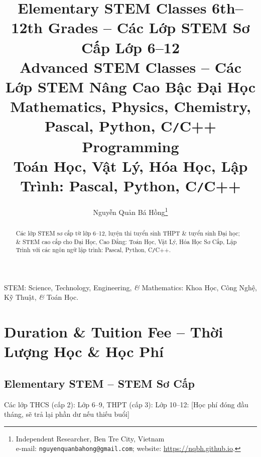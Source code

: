 \documentclass{article}
\title{Elementary STEM Classes 6th--12th Grades -- Các Lớp STEM Sơ Cấp Lớp 6--12\\Advanced STEM Classes -- Các Lớp STEM Nâng Cao Bậc Đại Học\\\vspace{5mm}Mathematics, Physics, Chemistry, Pascal, Python, C{\tt/}C++ Programming\\Toán Học, Vật Lý, Hóa Học, Lập Trình: Pascal, Python, C{\tt/}C++}
\author{Nguyễn Quản Bá Hồng\footnote{Independent Researcher, Ben Tre City, Vietnam\\e-mail: \texttt{nguyenquanbahong@gmail.com}; website: \url{https://nqbh.github.io}.}}
\date{}
\numberwithin{equation}{section}
\begin{document}
\maketitle
\begin{abstract}
	Các lớp STEM sơ cấp  từ lớp 6--12, luyện thi tuyển sinh THPT \& tuyển sinh Đại học; \& STEM cao cấp cho Đại Học, Cao Đẳng: Toán Học, Vật Lý, Hóa Học Sơ Cấp, Lập Trình với các ngôn ngữ lập trình: Pascal, Python, C{\tt/}C++.
\end{abstract}
STEM: Science, Technology, Engineering, {\it\&} Mathematics: Khoa Học, Công Nghệ, Kỹ Thuật, {\it\&} Toán Học.
\setcounter{secnumdepth}{4}
\setcounter{tocdepth}{3}


\section{Duration \& Tuition Fee -- Thời Lượng Học \& Học Phí}

\subsection{Elementary STEM -- STEM Sơ Cấp}
Các lớp THCS (cấp 2): Lớp 6--9, THPT (cấp 3): Lớp 10--12: [Học phí đóng đầu tháng, sẽ trả lại phần dư nếu thiếu buổi]
\end{document}
